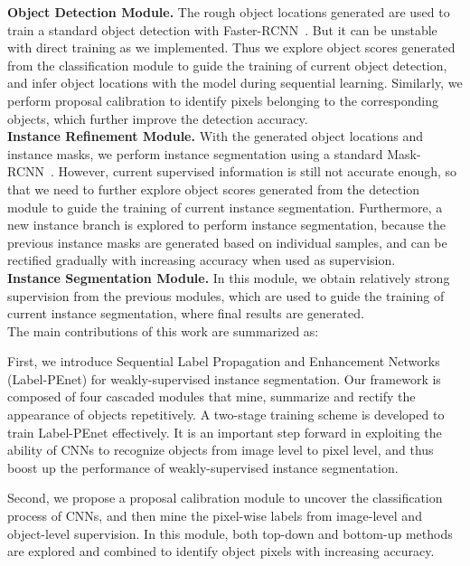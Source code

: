 \documentclass[10pt,twocolumn,letterpaper]{article}
\begin{document}
\noindent\textbf{Object Detection Module.}
The rough object locations generated are used to train a standard object detection with Faster-RCNN~\cite{renNIPS15fasterrcnn}. But it can be unstable with direct training as we implemented.
Thus we explore object scores generated from the classification module to guide the training of current object detection, and infer object locations with the model during sequential learning. Similarly, we perform proposal calibration to identify pixels belonging to the corresponding objects, which further improve the detection accuracy. \\





\noindent\textbf{Instance Refinement Module.} With the generated object locations and instance masks, we perform instance segmentation using a standard Mask-RCNN~\cite{he2017mask}. However, current supervised information is still not accurate enough, so that we need to further explore object scores generated from the detection module to guide the training of current instance segmentation. Furthermore, a new instance branch is explored to perform instance segmentation, because the previous instance masks are generated based on individual samples, and can be rectified gradually with increasing accuracy when used as supervision.\\



\noindent\textbf{Instance Segmentation Module.} In this module, we obtain relatively strong supervision from the previous modules, which are used to guide the training of current instance segmentation, where final results are generated.\\

The main contributions of this work are summarized as:

First, we introduce Sequential Label Propagation  and  Enhancement Networks (Label-PEnet) for weakly-supervised instance segmentation. Our framework is composed of four cascaded modules that mine, summarize and rectify the appearance of objects repetitively. A two-stage training scheme is developed to train Label-PEnet effectively. It is an important step forward in exploiting the ability of CNNs to recognize objects from image level to pixel level, and thus boost up the performance of weakly-supervised instance segmentation.

Second, we propose a proposal calibration module to uncover the classification process of CNNs, and then mine the pixel-wise labels from image-level and object-level supervision. In this module, both top-down and bottom-up methods are explored and combined to identify object pixels with increasing accuracy.
\end{document}
